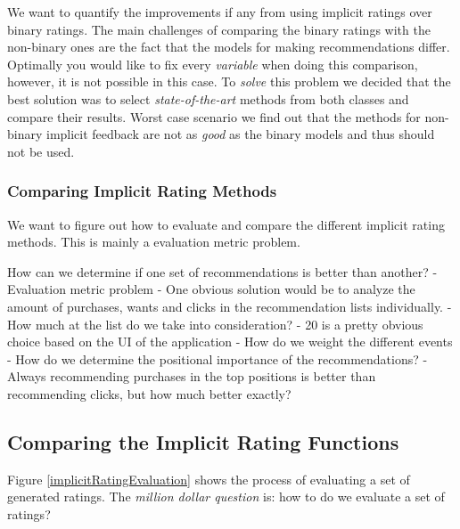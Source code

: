 We want to quantify the improvements if any from using implicit ratings over binary ratings.
The main challenges of comparing the binary ratings with the non-binary ones are the fact
that the models for making recommendations differ. Optimally you would like to fix every
\emph{variable} when doing this comparison, however, it is not possible in this case.
To \emph{solve} this problem we decided that the best solution was to select \emph{state-of-the-art}
methods from both classes and compare their results. Worst case scenario we find out that the
methods for non-binary implicit feedback are not as \emph{good} as the binary models and thus
should not be used.

\subsubsection{Comparing Implicit Rating Methods}

We want to figure out how to evaluate and compare the different implicit rating methods. 
This is mainly a evaluation metric problem. 

How can we determine if one set of recommendations is better than another?
	- Evaluation metric problem
	- One obvious solution would be to analyze the amount of purchases, wants and clicks
	  in the recommendation lists individually.
	  	- How much at the list do we take into consideration?
	  		- 20 is a pretty obvious choice based on the UI of the application
	  	- How do we weight the different events
	  	- How do we determine the positional importance of the recommendations?
	  		- Always recommending purchases in the top positions is better than
	  		  recommending clicks, but how much better exactly?







\subsection{Comparing the Implicit Rating Functions}

Figure \ref{implicitRatingEvaluation} shows the process of evaluating a set of generated ratings. The \emph{million dollar question} is: how to do we evaluate a set of ratings?









